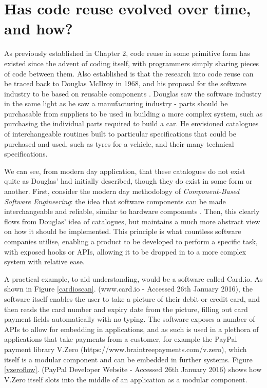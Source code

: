 \section{Has code reuse evolved over time, and how?}
As previously established in Chapter 2, code reuse in some primitive form has existed since the advent of coding itself, with programmers simply sharing pieces of code between them. Also established is that the research into code reuse can be traced back to Douglas McIlroy in 1968, and his proposal for the software industry to be based on reusable components \cite{Naur1969,Jacobson1997}. Douglas saw the software industry in the same light as he saw a manufacturing industry - parts should be purchasable from suppliers to be used in building a more complex system, such as purchasing the individual parts required to build a car. He envisioned catalogues of interchangeable routines built to particular specifications that could be purchased and used, such as tyres for a vehicle, and their many technical specifications.

We can see, from modern day application, that these catalogues do not exist quite as Douglas' had initially described, though they do exist in some form or another. First, consider the modern day methodology of \textit{Component-Based Software Engineering}: the idea that software components can be made interchangeable and reliable, similar to hardware components \cite{Foukalas2005}. Then, this clearly flows from Douglas' idea of catalogues, but maintains a much more abstract view on how it should be implemented. This principle is what countless software companies utilise, enabling a product to be developed to perform a specific task, with exposed hooks or APIs, allowing it to be dropped in to a more complex system with relative ease.

A practical example, to aid understanding, would be a software called Card.io. As shown in Figure \ref{cardioscan}. (www.card.io - Accessed 26th January 2016), the software itself enables the user to take a picture of their debit or credit card, and then reads the card number and expiry date from the picture, filling out card payment fields automatically with no typing. The software exposes a number of APIs to allow for embedding in applications, and as such is used in a plethora of applications that take payments from a customer, for example the PayPal payment library V.Zero (https://www.braintreepayments.com/v.zero), which itself is a modular component and can be embedded in further systems. Figure \ref{vzeroflow}. (PayPal Developer Website - Accessed 26th January 2016) shows how V.Zero itself slots into the middle of an application as a modular component.

